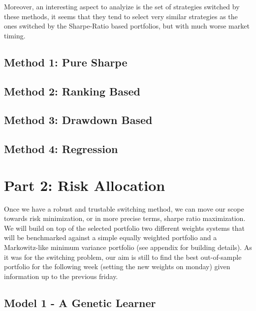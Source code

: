 \documentclass[12pt]{article} %
\numberwithin{equation}{subsection}
\begin{document}
Moreover, an interesting aspect to analyize is the set of strategies switched by these methods, it seems that they tend to select very similar strategies as the ones switched by the Sharpe-Ratio based portfolios, but with much worse market timing.\\

\subsection{Method 1: Pure Sharpe}




\subsection{Method 2: Ranking Based}




\subsection{Method 3: Drawdown Based}



\subsection{Method 4: Regression}



\section{Part 2: Risk Allocation}

Once we have a robust and trustable switching method, we can move our scope towards risk minimization, or in more precise terms, sharpe ratio maximization. We will build on top of the selected portfolio two different weights systems that will be benchmarked against a simple equally weighted portfolio and a Markowitz-like minimum variance portfolio (see appendix for building details). As it was for the switching problem, our aim is still to find the best out-of-sample portfolio for the following week (setting the new weights on monday) given information up to the previous friday. \\

\subsection{Model 1 - A Genetic Learner}
\end{document}
